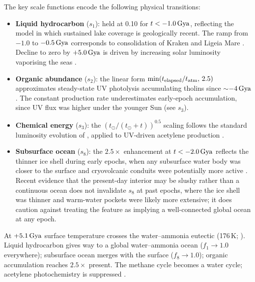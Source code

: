 The key scale functions encode the following physical transitions:
\begin{itemize}
  \item \textbf{Liquid hydrocarbon} ($s_1$): held at 0.10 for $t < -1.0\,\text{Gya}$,
    reflecting the \citet{Tobie2006} model in which sustained lake coverage is
    geologically recent.  The ramp from $-1.0$ to $-0.5\,\text{Gya}$ corresponds to
    consolidation of Kraken and Ligeia Mare \citep{Hayes2016,MitchellLora2016}.
    Decline to zero by $+5.0\,\text{Gya}$ is driven by increasing solar luminosity
    vaporising the seas \citep{Lorenz1997}.

  \item \textbf{Organic abundance} ($s_2$): the linear form
    $\min(t_{\rm elapsed}/t_\text{atm},\,2.5)$ approximates
    steady-state UV photolysis accumulating tholins since $\sim$$-4\,\text{Gya}$
    \citep{Niemann2005,Tobie2006}.  The constant production rate
    underestimates early-epoch accumulation, since UV flux was higher
    under the younger Sun (see $s_3$).

  \item \textbf{Chemical energy} ($s_3$): the $(t_\odot/(t_\odot\!+\!t))^{0.5}$
    scaling follows the standard luminosity evolution of \citet{Bahcall2001},
    applied to UV-driven acetylene production \citep{Strobel2010,Loison2015}.

  \item \textbf{Subsurface ocean} ($s_8$): the $2.5\times$ enhancement at
    $t < -2.0\,\text{Gya}$ reflects the thinner ice shell during early epochs, when any
    subsurface water body was closer to the surface and cryovolcanic conduits were potentially
    more active \citep{Iess2012,Nimmo2010,Tobie2005}.  Recent evidence that the present-day
    interior may be slushy rather than a continuous ocean \citep{Petricca2025} does not
    invalidate $s_8$ at past epochs, where the ice shell was thinner and warm-water pockets
    were likely more extensive; it does caution against treating the feature as implying
    a well-connected global ocean at any epoch.
\end{itemize}

At $+5.1\,\text{Gya}$ surface temperature crosses the water--ammonia eutectic (176\,K; \citealt{Grasset2005}).  Liquid hydrocarbon gives way to a global water--ammonia ocean ($f_1 \to 1.0$ everywhere); subsurface ocean merges with the surface ($f_8 \to 1.0$); organic accumulation reaches $2.5\times$ present.  The methane cycle becomes a water cycle; acetylene photochemistry is suppressed \citep{Lorenz1997}.

